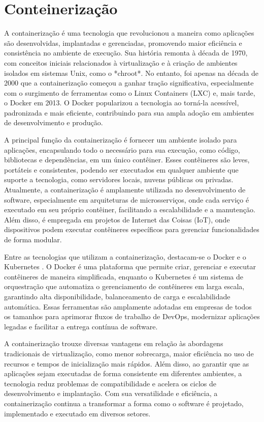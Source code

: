 \section{Conteinerização}

A containerização é uma tecnologia que revolucionou a maneira como aplicações são desenvolvidas, implantadas e gerenciadas, promovendo maior eficiência e consistência no ambiente de execução. Sua história remonta à década de 1970, com conceitos iniciais relacionados à virtualização e à criação de ambientes isolados em sistemas Unix, como o *chroot*. No entanto, foi apenas na década de 2000 que a containerização começou a ganhar tração significativa, especialmente com o surgimento de ferramentas como o Linux Containers (LXC) e, mais tarde, o Docker em 2013. O Docker \cite{DOCKER} popularizou a tecnologia ao torná-la acessível, padronizada e mais eficiente, contribuindo para sua ampla adoção em ambientes de desenvolvimento e produção.

A principal função da containerização é fornecer um ambiente isolado para aplicações, encapsulando todo o necessário para sua execução, como código, bibliotecas e dependências, em um único contêiner. Esses contêineres são leves, portáteis e consistentes, podendo ser executados em qualquer ambiente que suporte a tecnologia, como servidores locais, nuvens públicas ou privadas. Atualmente, a containerização é amplamente utilizada no desenvolvimento de software, especialmente em arquiteturas de microsserviços, onde cada serviço é executado em seu próprio contêiner, facilitando a escalabilidade e a manutenção. Além disso, é empregada em projetos de Internet das Coisas (IoT), onde dispositivos podem executar contêineres específicos para gerenciar funcionalidades de forma modular.

Entre as tecnologias que utilizam a containerização, destacam-se o Docker \cite{DOCKER} e o Kubernetes \cite{KUBERNETES}. O Docker é uma plataforma que permite criar, gerenciar e executar contêineres de maneira simplificada, enquanto o Kubernetes é um sistema de orquestração que automatiza o gerenciamento de contêineres em larga escala, garantindo alta disponibilidade, balanceamento de carga e escalabilidade automática. Essas ferramentas são amplamente adotadas em empresas de todos os tamanhos para aprimorar fluxos de trabalho de DevOps, modernizar aplicações legadas e facilitar a entrega contínua de software.

A containerização trouxe diversas vantagens em relação às abordagens tradicionais de virtualização, como menor sobrecarga, maior eficiência no uso de recursos e tempos de inicialização mais rápidos. Além disso, ao garantir que as aplicações sejam executadas de forma consistente em diferentes ambientes, a tecnologia reduz problemas de compatibilidade e acelera os ciclos de desenvolvimento e implantação. Com sua versatilidade e eficiência, a containerização continua a transformar a forma como o software é projetado, implementado e executado em diversos setores.

